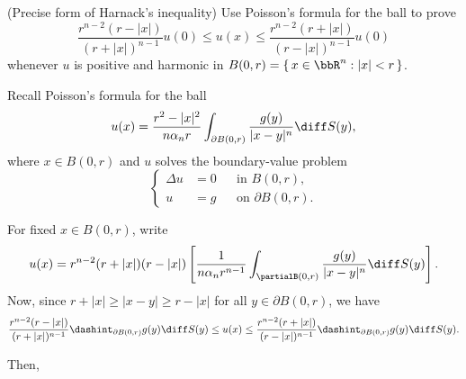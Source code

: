 \begin{problem}
  (Precise form of Harnack's inequality) Use Poisson's formula for the ball
  to prove
  \[
    \frac{r^{n-2}(r-|x|)}{(r+|x|)^{n-1}}u(0)%
    \leq u(x)%
    \leq \frac{r^{n-2}(r+|x|)}{(r-|x|)^{n-1}}u(0)
  \]
  whenever \(u\) is positive and harmonic in
  \(B(0,r)=\{\,x\in\bbR^n:|x|<r\,\}\).
\end{problem}
\begin{solution}
  Recall Poisson's formula for the ball
  \begin{equation}
    \label{eq:6:poissons-formula}
    u(x)=\frac{r^2-|x|^2}{n\alpha_nr}
    \int_{\partial B(0,r)}\frac{g(y)}{|x-y|^n}\diff S(y),
  \end{equation}
  where \(x\in B(0,r)\) and \(u\) solves the boundary-value problem
  \[
    \left\{
      \begin{aligned}
        \Delta u&=0&&\text{in \(B(0,r)\),}\\
        u&=g&&\text{on \(\partial B(0,r)\).}
      \end{aligned}
    \right.
  \]

  For fixed \(x\in B(0,r)\), write
  \[
    u(x)=r^{n-2}(r+|x|)(r-|x|)%
    \left[%
      \frac{1}{n\alpha_n r^{n-1}} \int_{\partial%
        B(0,r)}\frac{g(y)}{|x-y|^n}\diff S(y)%
    \right]%
    .
  \]
  Now, since \(r+|x|\geq |x-y|\geq r-|x|\) for all \(y\in\partial B(0,r)\),
  we have
  \begin{equation}
    \label{eq:6:desired-inequality}
    \frac{r^{n-2}(r-|x|)}{(r+|x|)^{n-1}}\dashint_{\partial
      B(0,r)}g(y)\diff S(y)\leq u(x)
    \leq\frac{r^{n-2}(r+|x|)}{(r-|x|)^{n-1}}\dashint_{\partial
      B(0,r)}g(y)\diff S(y).
  \end{equation}

  Then,
\end{solution}
\newpage

